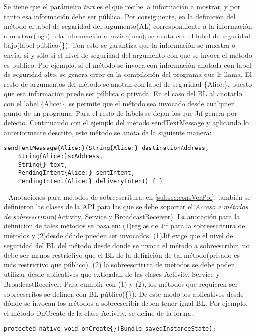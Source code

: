 Se tiene que el parámetro \emph{text} es el que recibe la información a mostrar,
y por tanto esa información debe ser pública.\newline 
Por consiguiente, en la definición del método el label de seguridad del
argumento(AL) correspondiente a la información a mostrar(logs) o la información
a enviar(sms), se anota con el label de seguridad bajo(label público\{\}). Con
esto se garantiza que la información se muestra o envía, si y sólo si el nivel
de seguridad del argumento con que se invoca el método es público. Por ejemplo,
si el método se invoca con información anotada con label de seguridad alto, se
genera error en la compilación del programa que le llama.\newline 
El resto de argumentos del método se anotan con label de seguridad \{Alice:\},
puesto que esa información puede ser pública o privada.\newline
En el caso del BL al anotarlo con el label \{Alice:\}, se permite que el método
sea invocado desde cualquier punto de un programa. 
Para el resto de labels se dejan los que Jif genera por defecto.\newline
Continuando con el ejemplo del método sendTextMessage y aplicando lo
anteriormente descrito, este método se anota de la siguiente manera:
\begin{lstlisting}
sendTextMessage{Alice:}(String{Alice:} destinationAddress, 
	String{Alice:}scAddress, 
	String{} text, 
	PendingIntent{Alice:} sentIntent,
	PendingIntent{Alice:} deliveryIntent) { }
\end{lstlisting}

- Anotaciones para métodos de sobreescritura: en \ref{subsec:consVerPol},
también se definieron las clases de la API para las que se debe soportar el
\textit{Acceso a métodos de sobreescritura}(Activity, Service y
BroadcastReceiver). La anotación para la definición de tales métodos se basa en:
(1)reglas de Jif para la sobreescritura de métodos y (2)desde dónde pueden ser
invocados. (1)Jif exige que el nivel de seguridad del BL del método desde donde
se invoca el método a sobreescribir, no debe ser menos restrictivo que el BL de
la definición de tal método(privado es más restrictivo que público). (2) la
sobreescritura de métodos se debe poder utilizar desde aplicativos que extiendan
de las clases Activity, Service y BroadcastReceiver.\newline 
Para cumplir con (1) y (2), los métodos que requieren ser sobreescritos se
definen con BL público(\{\}). De este modo los aplicativos desde dónde se
invocan los métodos a sobreescribir deben tener igual BL.\newline
Por ejemplo, el método OnCreate de la clase Activity, se define de la forma:
\begin{lstlisting}
protected native void onCreate{}(Bundle savedInstanceState);
\end{lstlisting}

